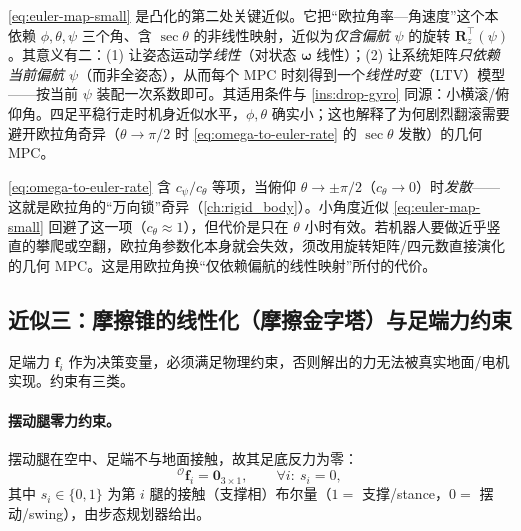 \begin{insight}\label{ins:euler-small}
\cref{eq:euler-map-small} 是凸化的第二处关键近似。它把“欧拉角率—角速度”这个本依赖 $\phi,\theta,\psi$ 三个角、含 $\sec\theta$ 的非线性映射，近似为\emph{仅含偏航 $\psi$} 的旋转 $\mathbf{R}_z^\top(\psi)$。其意义有二：(1) 让姿态运动学\emph{线性}（对状态 $\boldsymbol{\omega}$ 线性）；(2) 让系统矩阵\emph{只依赖当前偏航 $\psi$}（而非全姿态），从而每个 MPC 时刻得到一个\emph{线性时变}（LTV）模型——按当前 $\psi$ 装配一次系数即可。其适用条件与 \cref{ins:drop-gyro} 同源：小横滚/俯仰角。四足平稳行走时机身近似水平，$\phi,\theta$ 确实小；这也解释了为何剧烈翻滚需要避开欧拉角奇异（$\theta\to\pi/2$ 时 \cref{eq:omega-to-euler-rate} 的 $\sec\theta$ 发散）的几何 MPC。
\end{insight}

\begin{pitfall}
\cref{eq:omega-to-euler-rate} 含 $c_\psi/c_\theta$ 等项，当俯仰 $\theta\to\pm\pi/2$（$c_\theta\to0$）时\emph{发散}——这就是欧拉角的“万向锁”奇异（\cref{ch:rigid_body}）。小角度近似 \cref{eq:euler-map-small} 回避了这一项（$c_\theta\approx1$），但代价是只在 $\theta$ 小时有效。若机器人要做近乎竖直的攀爬或空翻，欧拉角参数化本身就会失效，须改用旋转矩阵/四元数直接演化的几何 MPC\cite{ding2021repfree}。这是用欧拉角换“仅依赖偏航的线性映射”所付的代价。
\end{pitfall}

\subsection{近似三：摩擦锥的线性化（摩擦金字塔）与足端力约束}
\label{subsec:friction}

足端力 $\mathbf{f}_i$ 作为决策变量，必须满足物理约束，否则解出的力无法被真实地面/电机实现。约束有三类。

\paragraph{ 摆动腿零力约束。}
摆动腿在空中、足端不与地面接触，故其足底反力为零\cite{dicarlo2018cheetah,yu2021quadruped}：
\begin{equation}
  {}^{\mathcal{O}}\boldsymbol{f}_i=\mathbf{0}_{3\times1},\qquad \forall i:\ s_i=0,
  \label{eq:swing-zero}
\end{equation}
其中 $s_i\in\{0,1\}$ 为第 $i$ 腿的接触（支撑相）布尔量（$1=$ 支撑/stance，$0=$ 摆动/swing），由步态规划器给出。

